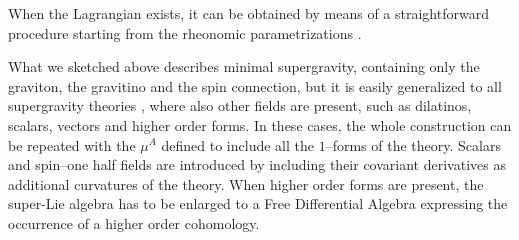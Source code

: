 \documentclass[a4paper,12pt]{article}
\begin{document}
When the Lagrangian exists, it can be obtained by means of a straightforward
procedure starting from the rheonomic parametrizations \cite{castdauriafre}.
\par
What we sketched above describes minimal supergravity, containing only the
graviton, the gravitino and the spin connection, but it is easily generalized to
all supergravity theories \cite{castdauriafre}, where also other fields are present, such as dilatinos,
scalars, vectors and higher order forms. In these cases, the whole
construction can be repeated with the $\mu^A$ defined to include all the
$1$--forms of the theory. Scalars and spin--one half fields are introduced by
including their covariant derivatives as additional curvatures of the
theory. When higher order forms are present, the super-Lie algebra has to be
enlarged to a Free Differential Algebra expressing the occurrence of a
higher order cohomology.
\end{document}
